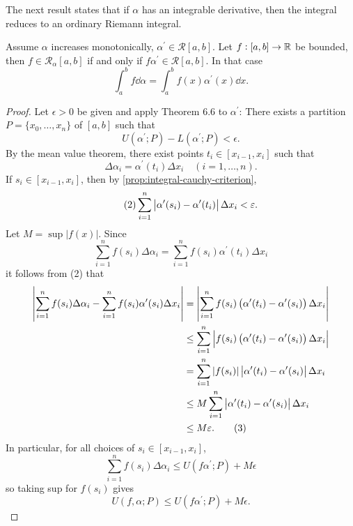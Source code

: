 The next result states that if $\alpha$ has an integrable derivative, then the integral reduces to an ordinary Riemann integral.

\begin{proposition}
Assume $\alpha$ increases monotonically, $\alpha^\prime\in\mathcal{R}[a,b]$. Let $f:[a,b]\to\mathbb R$ be bounded, then $f\in \mathcal{R}_\alpha[a,b]$ if and only if $f\alpha^\prime\in\mathcal{R}[a,b]$. In that case
\begin{equation}
\int_{a}^{b}f\dd{\alpha}=\int_{a}^{b}f(x)\alpha^\prime(x)\dd{x}.
\end{equation}
\end{proposition}

\begin{proof}
Let $\epsilon>0$ be given and apply Theorem 6.6 to $\alpha^\prime$: There exists a partition $P=\{x_0,\dots,x_n\}$ of $[a,b]$ such that
\begin{equation*}\tag{1}
U(\alpha^\prime;P)-L(\alpha^\prime;P)<\epsilon.
\end{equation*}
By the mean value theorem, there exist points $t_i\in[x_{i-1},x_i]$ such that
\[\Delta\alpha_i=\alpha^\prime(t_i)\Delta x_i\quad(i=1,\dots,n).\]
If $s_i\in[x_{i-1},x_i]$, then by \cref{prop:integral-cauchy-criterion},
\begin{equation*}\tag{2}
\sum_{i=1}^{n}\left|\alpha^\prime(s_i)-\alpha^\prime(t_i)\right|\Delta x_i<\varepsilon.
\end{equation*}
Let $M=\sup|f(x)|$. Since
\[\sum_{i=1}^{n}f(s_i)\Delta\alpha_i=\sum_{i=1}^{n}f(s_i)\alpha^\prime(t_i)\Delta x_i\]
it follows from (2) that
\begin{align*}
\left|\sum_{i=1}^{n}f(s_i)\Delta\alpha_i-\sum_{i=1}^{n}f(s_i)\alpha^\prime(s_i)\Delta x_i\right|
&=\left|\sum_{i=1}^{n}f(s_i)\left(\alpha^\prime(t_i)-\alpha^\prime(s_i)\right)\Delta x_i\right|\\
&\le\sum_{i=1}^{n}\left|f(s_i)\left(\alpha^\prime(t_i)-\alpha^\prime(s_i)\right)\Delta x_i\right|\\
&=\sum_{i=1}^{n}|f(s_i)|\left|\alpha^\prime(t_i)-\alpha^\prime(s_i)\right|\Delta x_i\\
&\le M\sum_{i=1}^{n}\left|\alpha^\prime(t_i)-\alpha^\prime(s_i)\right|\Delta x_i\\
&\le M\varepsilon.\tag{3}
\end{align*}
In particular, for all choices of $s_i\in[x_{i-1},x_i]$,
\[\sum_{i=1}^{n}f(s_i)\Delta\alpha_i\le U(f\alpha^\prime;P)+M\epsilon\]
so taking sup for $f(s_i)$ gives
\[U(f,\alpha;P)\le U(f\alpha^\prime;P)+M\epsilon.\]

\end{proof}
